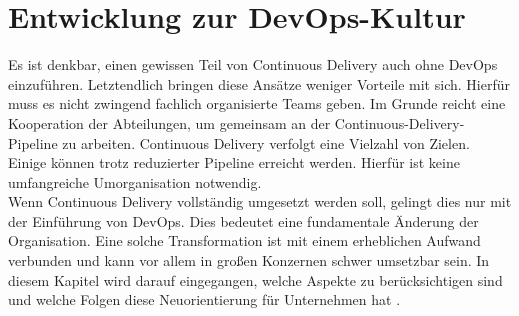 \section{Entwicklung zur DevOps-Kultur} \label{entwicklung}
Es ist denkbar, einen gewissen Teil von Continuous Delivery auch ohne DevOps einzuführen. Letztendlich bringen diese Ansätze weniger Vorteile mit sich. Hierfür muss es nicht zwingend fachlich organisierte Teams geben. Im Grunde reicht eine Kooperation der Abteilungen, um gemeinsam an der Continuous-Delivery-Pipeline zu arbeiten. Continuous Delivery verfolgt eine Vielzahl von Zielen. Einige können trotz reduzierter Pipeline erreicht werden. Hierfür ist keine umfangreiche Umorganisation notwendig.\\ Wenn Continuous Delivery vollständig umgesetzt werden soll, gelingt dies nur mit der Einführung von DevOps. Dies bedeutet eine fundamentale Änderung der Organisation. Eine solche Transformation ist mit einem erheblichen Aufwand verbunden und kann vor allem in großen Konzernen schwer umsetzbar sein. In diesem Kapitel wird darauf eingegangen, welche Aspekte zu berücksichtigen sind und welche Folgen diese Neuorientierung für Unternehmen hat \cite{Wolff.2016}.

